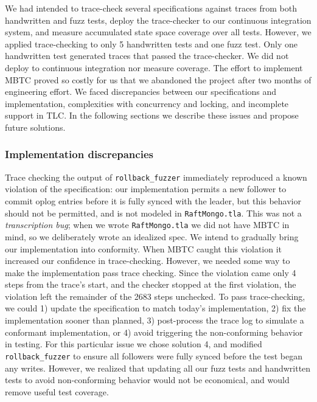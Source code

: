 \documentclass{vldb}
\begin{document}
We had intended to trace-check several specifications against traces from both handwritten and fuzz tests, deploy the trace-checker to our continuous integration system, and measure accumulated state space coverage over all tests. However, we applied trace-checking to only 5 handwritten tests and one fuzz test. Only one handwritten test generated traces that passed the trace-checker. We did not deploy to continuous integration nor measure coverage. The effort to implement MBTC proved so costly for us that we abandoned the project after two months of engineering effort. We faced discrepancies between our specifications and implementation, complexities with concurrency and locking, and incomplete support in TLC. In the following sections we describe these issues and propose future solutions.

\subsubsection{Implementation discrepancies}


Trace checking the output of \texttt{rollback\_fuzzer} immediately reproduced a known violation of the specification: our implementation permits a new follower to commit oplog entries before it is fully synced with the leader, but this behavior should not be permitted, and is not modeled in \texttt{RaftMongo.tla}. This was not a \textit{transcription bug}; when we wrote \texttt{RaftMongo.tla} we did not have MBTC in mind, so we deliberately wrote an idealized spec. We intend to gradually bring our implementation into conformity. When MBTC caught this violation it increased our confidence in trace-checking. However, we needed some way to make the implementation pass trace checking. Since the violation came only 4 steps from the trace's start, and the checker stopped at the first violation, the violation left the remainder of the 2683 steps unchecked. To pass trace-checking, we could 1) update the specification to match today's implementation, 2) fix the implementation sooner than planned, 3) post-process the trace log to simulate a conformant implementation, or 4) avoid triggering the non-conforming behavior in testing. For this particular issue we chose solution 4, and modified \texttt{rollback\_fuzzer} to ensure all followers were fully synced before the test began any writes. However, we realized that updating all our fuzz tests and handwritten tests to avoid non-conforming behavior would not be economical, and would remove useful test coverage.
\end{document}
